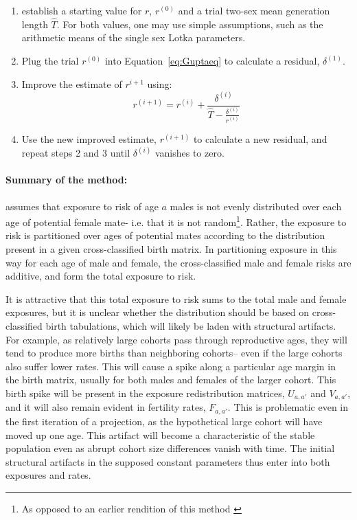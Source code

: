 \begin{enumerate}
  \item establish a starting value for $r$,
$r^{(0)}$ and a trial two-sex mean generation length
$\widehat{T}$. For both values, one may use simple
assumptions, such as the arithmetic means of the single sex Lotka parameters.
  \item Plug the trial $r^{(0)}$ into Equation~\eqref{eq:Guptaeq}
  to calculate a residual, $\delta ^{(1)}$.
  \item Improve the estimate of $r^{i+1}$ using:
  \begin{equation}
  r^{(i+1)} = r^{(i)} + \frac{\delta^{(i)}}{\widehat{T} -
\frac{\delta ^{(i)}}{r^{(i)} }}
  \end{equation}
  \item Use the new improved estimate, $r^{(i+1)}$ to calculate a new residual,
  and repeat steps 2 and 3 until $\delta^{(i)}$ vanishes to zero.
\end{enumerate}

\paragraph{Summary of the method: } \citet{gupta1978alternative} assumes that exposure to risk of
 age $a$ males is not evenly distributed over each age of potential female mate-
 i.e. that it is not random\footnote{As opposed to an earlier rendition of
 this method \citep{gupta1972two}}. Rather, the exposure to risk is partitioned
 over ages of potential mates according to the distribution present in a given 
 cross-classified birth matrix. In partitioning exposure in this way for each
 age of male and female, the cross-classified male and female risks are additive, and
 form the total exposure to risk. 
 
 It is attractive that this total exposure to
 risk sums to the total male and female exposures, but it is unclear whether the
 distribution should be based on cross-classified birth tabulations, which will
 likely be laden with structural artifacts. For example, as relatively large
 cohorts pass through reproductive ages, they will tend to produce more births
 than neighboring cohorts-- even if the large cohorts also suffer lower rates.
 This will cause a spike along a particular age margin in the birth matrix,
 usually for both males and females of the larger cohort. This birth spike will
 be present in the exposure redistribution matrices, $U_{a,a'}$ and
 $V_{a,a'}$, and it will also remain evident in fertility rates, $F_{a,a'}$.
 This is problematic even in the first iteration of a projection, as the
 hypothetical large cohort will have moved up one age. This artifact will
become a characteristic of the stable population even as abrupt cohort size
differences vanish with time. The initial structural artifacts in the supposed
constant parameters thus enter into both exposures and rates. 

